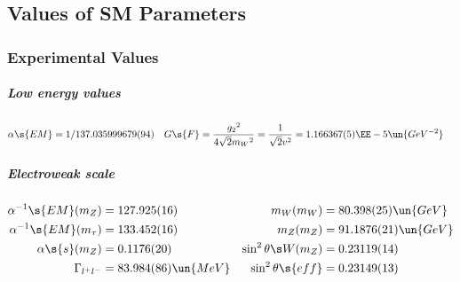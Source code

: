 \subsection{Values of SM Parameters}
\subsubsection{Experimental Values}
\subparagraph{Low energy values}
\begin{align*}
 \alpha\s{EM} &= 1/137.035999679(94) &
 G\s{F}       &= \frac{{g_2}^2}{4\sqrt2{m_W}^2} = \frac1{\sqrt2v^2} = 1.166367(5)\EE-5\un{GeV^{-2}}&
\end{align*}

\subparagraph{Electroweak scale}
\begin{align*}
 \alpha^{-1}\s{EM}(m_Z)    &= 127.925(16) & m_W(m_W) &= 80.398(25)\un{GeV}\\
 \alpha^{-1}\s{EM}(m_\tau) &= 133.452(16) & m_Z(m_Z) &= 91.1876(21)\un{GeV}\\
 \alpha\s{s}(m_Z)          &= 0.1176(20)  & \sin^2\theta\s W(m_Z) &= 0.23119(14)\\
 \Gamma_{l^+l^-}           &= 83.984(86)\un{MeV}  & \sin^2\theta\s{eff}   &= 0.23149(13)
\end{align*}

